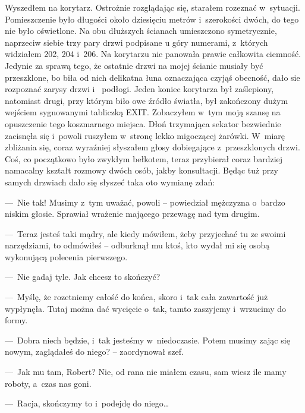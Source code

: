 Wyszedłem na korytarz. Ostrożnie rozglądając się, starałem rozeznać w~sytuacji. Pomieszczenie było długości około 
dziesięciu metrów i~szerokości dwóch, do tego nie było oświetlone. Na obu dłuższych ścianach umieszczono 
symetrycznie, naprzeciw siebie trzy pary drzwi podpisane u góry numerami, z~których widziałem 202, 204 i~206. Na 
korytarzu nie panowała prawie całkowita ciemność. Jedynie za sprawą tego, że ostatnie drzwi na mojej ścianie musiały 
być przeszklone, bo biła od nich delikatna łuna oznaczająca czyjąś obecność, dało sie rozpoznać zarysy drzwi i~
podłogi.  Jeden koniec korytarza był zaślepiony, natomiast drugi, przy którym biło owe źródło światła, był zakończony 
dużym wejściem sygnowanymi tabliczką EXIT. Zobaczyłem w~tym moją szansę na opuszczenie tego koszmarnego miejsca. Dłoń 
trzymająca sekator bezwiednie zacisnęła się i~powoli ruszyłem w~stronę lekko migoczącej żarówki. W~miarę zbliżania 
się, coraz wyraźniej słyszałem głosy dobiegające z~przeszklonych drzwi. Coś, co początkowo było zwykłym bełkotem, 
teraz przybierał coraz bardziej namacalny kształt rozmowy dwóch osób, jakby konsultacji. Będąc tuż przy samych 
drzwiach dało się słyszeć taka oto wymianę zdań:

---~Nie tak! Musimy z~tym uważać, powoli -- powiedział mężczyzna o~bardzo niskim głosie. Sprawiał wrażenie mającego 
przewagę nad tym drugim. 

---~Teraz jesteś taki mądry, ale kiedy mówiłem, żeby przyjechać tu ze swoimi narzędziami, to odmówiłeś -- odburknął 
mu ktoś, kto wydał mi się osobą wykonującą polecenia pierwszego. 

---~Nie gadaj tyle. Jak chcesz to skończyć? 

---~Myślę, że rozetniemy całość do końca, skoro i~tak cała zawartość już wypłynęła. Tutaj można dać wycięcie o~tak, 
tamto zaszyjemy i~wrzucimy do formy. 

---~Dobra niech będzie, i~tak jesteśmy w~niedoczasie. Potem musimy zając się nowym, zaglądałeś do niego? -- 
zaordynował szef.

---~Jak mu tam, Robert? Nie, od rana nie miałem czasu, sam wiesz ile mamy roboty, a~czas nas goni. 

---~Racja, skończymy to i~podejdę do niego… 


